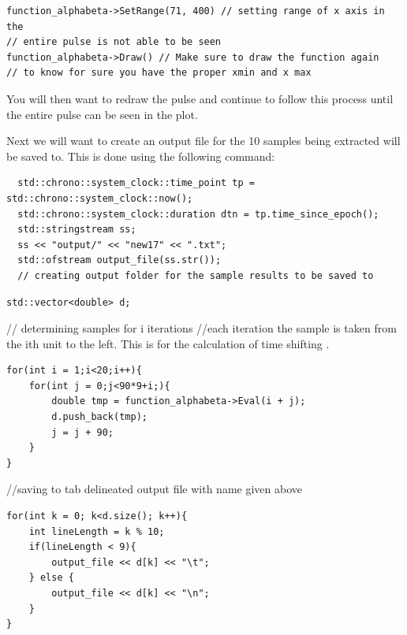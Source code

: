 \documentclass{article}
\begin{document}
 \begin{verbatim} 
function_alphabeta->SetRange(71, 400) // setting range of x axis in the 
// entire pulse is not able to be seen 
function_alphabeta->Draw() // Make sure to draw the function again 
// to know for sure you have the proper xmin and x max 
\end{verbatim}

You will then want to redraw the pulse and continue to follow this process until the entire pulse can be seen in the plot. 
\\
\vspace{5mm}

Next we will want to create an output file for the 10 samples being extracted will be saved to. This is done using the following command: 

\begin{verbatim} 
  std::chrono::system_clock::time_point tp = std::chrono::system_clock::now();
  std::chrono::system_clock::duration dtn = tp.time_since_epoch();
  std::stringstream ss;
  ss << "output/" << "new17" << ".txt";
  std::ofstream output_file(ss.str());
  // creating output folder for the sample results to be saved to 
\end{verbatim}




\begin{verbatim} 
std::vector<double> d;
\end{verbatim}
// determining samples for i iterations 
//each iteration the sample is taken from the ith unit to the left. This is for the calculation of time shifting . 

\begin{verbatim} 
for(int i = 1;i<20;i++){
    for(int j = 0;j<90*9+i;){
        double tmp = function_alphabeta->Eval(i + j);
        d.push_back(tmp);       
        j = j + 90;
    }
}

\end{verbatim}
//saving to tab delineated output file with name given above 

\begin{verbatim} 
for(int k = 0; k<d.size(); k++){ 
    int lineLength = k % 10; 
    if(lineLength < 9){  
        output_file << d[k] << "\t";
    } else {
        output_file << d[k] << "\n";     
    }
}
\end{verbatim}
\end{document}

